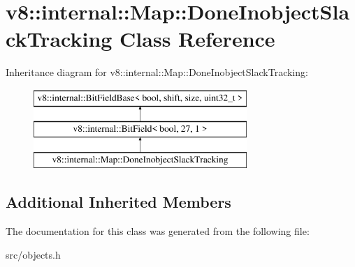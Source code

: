 \hypertarget{classv8_1_1internal_1_1_map_1_1_done_inobject_slack_tracking}{}\section{v8\+:\+:internal\+:\+:Map\+:\+:Done\+Inobject\+Slack\+Tracking Class Reference}
\label{classv8_1_1internal_1_1_map_1_1_done_inobject_slack_tracking}
Inheritance diagram for v8\+:\+:internal\+:\+:Map\+:\+:Done\+Inobject\+Slack\+Tracking\+:\begin{figure}[H]
\begin{center}
\leavevmode
\includegraphics[height=3.000000cm]{classv8_1_1internal_1_1_map_1_1_done_inobject_slack_tracking}
\end{center}
\end{figure}
\subsection*{Additional Inherited Members}


The documentation for this class was generated from the following file\+:\begin{DoxyCompactItemize}
\item 
src/objects.\+h\end{DoxyCompactItemize}
